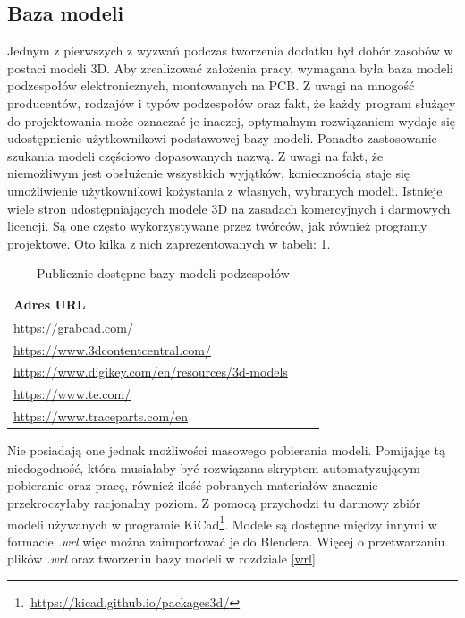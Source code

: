 \documentclass{xmgr}
\begin{document}
\subsection{Baza modeli}

Jednym z pierwszych z wyzwań podczas tworzenia dodatku był dobór zasobów w postaci modeli 3D. Aby zrealizować założenia pracy, wymagana była baza modeli podzespołów elektronicznych, montowanych na PCB. Z uwagi na mnogość producentów, rodzajów i typów podzespołów oraz fakt, że każdy program służący do projektowania może oznaczać je inaczej, optymalnym rozwiązaniem wydaje się udostępnienie użytkownikowi podstawowej bazy modeli. Ponadto zastosowanie szukania modeli częściowo dopasowanych nazwą. Z uwagi na fakt, że niemożliwym jest obsłużenie wszystkich wyjątków, koniecznością staje się umożliwienie użytkownikowi kożystania z własnych, wybranych modeli. Istnieje wiele stron udostępniających modele 3D na zasadach komercyjnych i darmowych licencji. Są one często wykorzystywane przez twórców, jak również programy projektowe. Oto kilka z nich zaprezentowanych w tabeli: \ref{fig:table}.

\begin{table}[htb]
\begin{tabular}{|l|l|l|} \hline
Adres URL \\ \hline
\url{https://grabcad.com/} \\ \hline
\url{https://www.3dcontentcentral.com/} \\ \hline
\url{https://www.digikey.com/en/resources/3d-models} \\ \hline
\url{https://www.te.com/} \\ \hline
\url{https://www.traceparts.com/en} \\ \hline
\end{tabular}
\caption{Publicznie dostępne bazy modeli podzespołów}
\label{fig:table}
\end{table}
Nie posiadają one jednak możliwości masowego pobierania modeli. Pomijając tą niedogodność, która musiałaby być rozwiązana skryptem automatyzującym pobieranie oraz pracę, również ilość pobranych materiałów znacznie przekroczyłaby racjonalny poziom. Z pomocą przychodzi tu darmowy zbiór modeli używanych w programie KiCad\footnote{\,\url{https://kicad.github.io/packages3d/}}. Modele są dostępne między innymi w formacie \emph{.wrl} więc można zaimportować je do Blendera. Więcej o przetwarzaniu plików \emph{.wrl} oraz tworzeniu bazy modeli w rozdziale \ref{wrl}.
\end{document}
